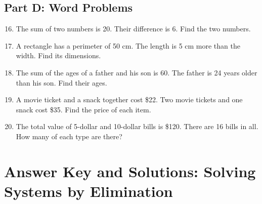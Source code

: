 \documentclass[12pt]{article}
\begin{document}
\subsection*{Part D: Word Problems}
\begin{enumerate}
    \setcounter{enumi}{15}
    \item The sum of two numbers is 20. Their difference is 6. Find the two numbers.
    \item A rectangle has a perimeter of 50 cm. The length is 5 cm more than the width. Find its dimensions.
    \item The sum of the ages of a father and his son is 60. The father is 24 years older than his son. Find their ages.
    \item A movie ticket and a snack together cost \$22. Two movie tickets and one snack cost \$35. Find the price of each item.
    \item The total value of 5-dollar and 10-dollar bills is \$120. There are 16 bills in all. How many of each type are there?
\end{enumerate}


\section*{Answer Key and Solutions: Solving Systems by Elimination}
\end{document}
